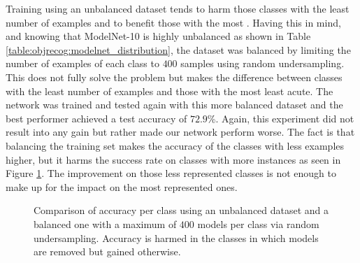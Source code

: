 Training using an unbalanced dataset tends to harm those classes with the least number of examples and to benefit those with the most \cite{Dalyak2014}. Having this in mind, and knowing that ModelNet-10 is highly unbalanced as shown in Table \ref{table:objrecog:modelnet_distribution}, the dataset was balanced by limiting the number of examples of each class to $400$ samples using random undersampling. This does not fully solve the problem but makes the difference between classes with the least number of examples and those with the most least acute. The network was trained and tested again with this more balanced dataset and the best performer achieved a test accuracy of $72.9$\%. Again, this experiment did not result into any gain but rather made our network perform worse. The fact is that balancing the training set makes the accuracy of the classes with less examples higher, but it harms the success rate on classes with more instances as seen in Figure \ref{fig:objrecog:balunbal}. The improvement on those less represented classes is not enough to make up for the impact on the most represented ones.

\begin{figure}[!htb]
    \centering
    \caption{Comparison of accuracy per class using an unbalanced dataset and a balanced one with a maximum of $400$ models per class via random undersampling. Accuracy is harmed in the classes in which models are removed but gained otherwise.}
    \label{fig:objrecog:balunbal}
\end{figure}

